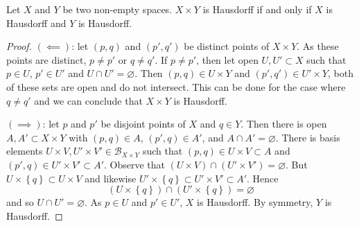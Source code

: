 \begin{proposition}[]
Let $X$ and $Y$ be two non-empty spaces.
$X \times Y$ is Hausdorff if and only if
$X$ is Hausdorff and $Y$ is Hausdorff.
\end{proposition}

\begin{proof}
	$(\impliedby)$: let $(p,q)$ and $(p',q')$ be distinct points of
	$X \times Y$.
	As these points are distinct, $p \neq p'$ or $q \neq q'$.
	If $p \neq p'$, then let open $U, U' \subset X$ such that
	$p \in U$, $p' \in U'$ and $U \cap U' = \varnothing$.
	Then $(p,q) \in U \times Y$ and $(p', q') \in U' \times Y$,
	both of these sets are open and do not intersect.
	This can be done for the case where $q \neq q'$ and we can conclude that
	$X \times Y$ is Hausdorff.

	$(\implies)$: 
	let $p$ and $p'$ be disjoint points of $X$ and $q \in Y$.
	Then there is open $A, A' \subset X \times Y$ with
	$(p,q) \in A$, $(p', q) \in A'$, and $A \cap A' = \varnothing$.
	There is basis elements 
	$U \times V, U' \times V' \in \mathcal B_{X \times Y}$ such that
	$(p,q) \in U \times V \subset A$ and
	$(p',q) \in U' \times V' \subset A'$.
	Observe that $(U \times V) \cap (U' \times V') = \varnothing$.
	But
	$U \times \left\{ q \right\} \subset U \times V$
	and likewise $U' \times \left\{ q \right\} \subset U' \times V' \subset A'$.
	Hence
	\[
		\left( U \times \left\{ q \right\} \right) \cap
		\left( U' \times \left\{ q \right\} \right)
		= \varnothing
	\]
	and so $U \cap U' = \varnothing$.
	As $p \in U$ and $p' \in U'$, $X$ is Hausdorff.
	By symmetry, $Y$ is Hausdorff.
\end{proof}
